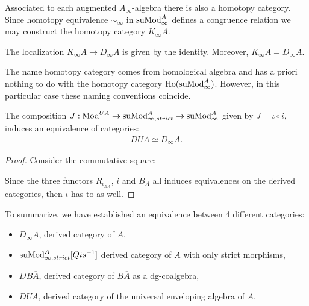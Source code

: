 \documentclass[../thesis.tex]{subfiles}
\begin{document}
            Associated to each augmented $A_\infty$-algebra there is also a homotopy category. Since homotopy equivalence $\sim_\infty$ in $\tt{suMod}_\infty^A$ defines a congruence relation we may construct the homotopy category $K_\infty A$.

            \begin{corollary}
                The localization $K_\infty A \to D_\infty A$ is given by the identity. Moreover, $K_\infty A = D_\infty A$.
            \end{corollary}

            \begin{remark}
                The name homotopy category comes from homological algebra and has a priori nothing to do with the homotopy category $\tt{Ho}(\tt{suMod}_\infty^A)$. However, in this particular case these naming conventions coincide.
            \end{remark}

            \begin{lemma}\label{lem: universal-enveloping-is-derived}
                The composition $J : \tt{Mod}^{UA} \to \tt{suMod}_{\infty, strict}^A \to \tt{suMod}_\infty^A$ given by $J = \iota \circ i$, induces an equivalence of categories:
                \begin{align*}
                    DUA \simeq D_\infty A.
                \end{align*}
            \end{lemma}

            \begin{proof}
                Consider the commutative square:
                \begin{center}
                \end{center}

                Since the three functors $R_{\iota_{B\overline{A}}}$, $i$ and $B_A$ all induces equivalences on the derived categories, then $\iota$ has to as well.
            \end{proof}

            To summarize, we have established an equivalence between 4 different categories:
            \begin{itemize}
                \item $D_\infty A$, derived category of $A$,
                \item $\tt{suMod}_{\infty, strict}^A[Qis^{-1}]$ derived category of $A$ with only strict morphisms,
                \item $DB\overline{A}$, derived category of $B\overline{A}$ as a dg-coalgebra,
                \item $DUA$, derived category of the universal enveloping algebra of $A$.
            \end{itemize}
\end{document}
